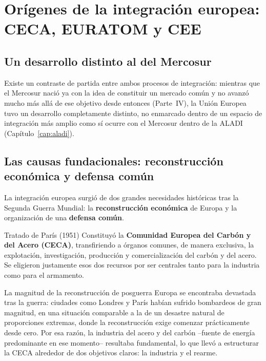 \documentclass[12pt,oneside]{book}
\renewcommand{\chaptermark}[1]{\markboth{\thechapter.\ #1}{}}
\begin{document}
\chapter{Orígenes de la integración europea: CECA, EURATOM y CEE}
\chaptermark{Orígenes de la Unión Europea}
\label{cap:origenes-ue}

\section{Un desarrollo distinto al del Mercosur}

Existe un contraste de partida entre ambos procesos de integración: mientras que el Mercosur nació ya con la idea de constituir un mercado común y no avanzó mucho más allá de ese objetivo desde entonces (Parte~IV), la Unión Europea tuvo un desarrollo completamente distinto, no enmarcado dentro de un espacio de integración más amplio como sí ocurre con el Mercosur dentro de la ALADI (Capítulo~\ref{cap:aladi}).

\section{Las causas fundacionales: reconstrucción económica y defensa común}

La integración europea surgió de dos grandes necesidades históricas tras la Segunda Guerra Mundial: la \textbf{reconstrucción económica} de Europa y la organización de una \textbf{defensa común}.

\begin{normacitada}{Tratado de París (1951)}
Constituyó la \textbf{Comunidad Europea del Carbón y del Acero (CECA)}, transfiriendo a órganos comunes, de manera exclusiva, la explotación, investigación, producción y comercialización del carbón y del acero. Se eligieron justamente esos dos recursos por ser centrales tanto para la industria como para el armamento.
\end{normacitada}

\begin{ejemplo}{La magnitud de la reconstrucción de posguerra}
Europa se encontraba devastada tras la guerra: ciudades como Londres y París habían sufrido bombardeos de gran magnitud, en una situación comparable a la de un desastre natural de proporciones extremas, donde la reconstrucción exige comenzar prácticamente desde cero. Por esa razón, la industria del acero y del carbón --fuente de energía predominante en ese momento-- resultaba fundamental, lo que llevó a estructurar la CECA alrededor de dos objetivos claros: la industria y el rearme.
\end{ejemplo}
\end{document}
